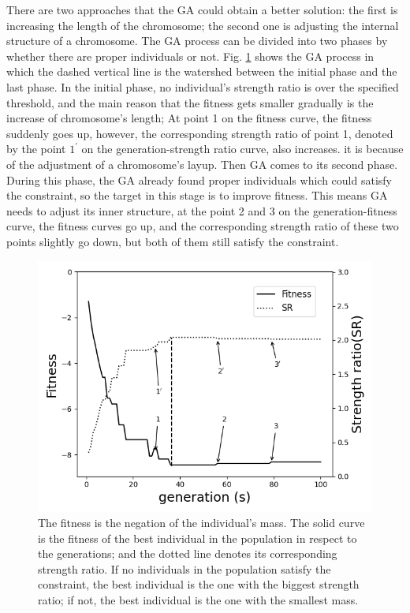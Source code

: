 \documentclass[10pt, journal]{IEEEtran}
\begin{document}
There are two approaches that the GA could obtain a better solution: the first
is increasing the length of the chromosome; the second one is adjusting the
internal structure of a chromosome. The GA process can be divided into two
phases by whether there are proper individuals or not. Fig.
\ref{fig:sr} shows the GA process in which the dashed vertical line is the
watershed between the initial phase and the last phase. In the initial phase,
no individual's strength ratio is over the specified threshold, and the main
reason that the fitness gets smaller gradually is the increase of chromosome's
length; At point 1 on the fitness curve, the fitness suddenly goes up, however,
the corresponding strength ratio of point 1, denoted by the point $1^{\prime}$
on the generation-strength ratio curve, also increases. it is because of the
adjustment of a chromosome's layup.  Then GA comes to its second phase. During
this phase, the GA already found proper individuals which could satisfy the
constraint, so the target in this stage is to improve fitness. This means GA
needs to adjust its inner structure, at the point 2 and 3 on the
generation-fitness curve, the fitness curves go up, and the corresponding
strength ratio of these two points slightly go down, but both of them still
satisfy the constraint.
\begin{figure}[!b]
	\centering
	\includegraphics[width=\linewidth]{fitness_strength_ratio.png}
	\caption{The fitness is the negation of the individual's mass. The solid
		curve is the fitness of the best individual in the population in respect
		to the generations; and the dotted line denotes its corresponding strength
		ratio. If no individuals in the population satisfy the constraint, the
		best individual is the one with the biggest strength ratio; if not, the
		best individual is the one with the smallest mass.
}
	\label{fig:sr}
\end{figure}
\end{document}
